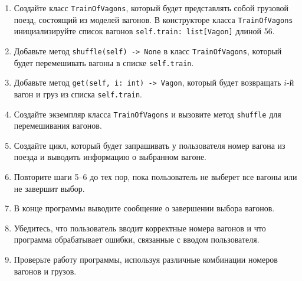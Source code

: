 \begin{enumerate}
\begin{enumerate}
    \item Создайте класс \texttt{TrainOfVagons}, который будет представлять собой грузовой поезд, состоящий из моделей вагонов. В конструкторе класса \texttt{TrainOfVagons} инициализируйте список вагонов \texttt{self.train: list[Vagon]} длиной 56.

    \item Добавьте метод \texttt{shuffle(self) -> None} в класс \texttt{TrainOfVagons}, который будет перемешивать вагоны в списке \texttt{self.train}.

    \item Добавьте метод \texttt{get(self, i: int) -> Vagon}, который будет возвращать $i$-й вагон и груз из списка \texttt{self.train}.

    \item Создайте экземпляр класса \texttt{TrainOfVagons} и вызовите метод \texttt{shuffle} для перемешивания вагонов.

    \item Создайте цикл, который будет запрашивать у пользователя номер вагона из поезда и выводить информацию о выбранном вагоне.

    \item Повторите шаги 5–6 до тех пор, пока пользователь не выберет все вагоны или не завершит выбор.

    \item В конце программы выводите сообщение о завершении выбора вагонов.

    \item Убедитесь, что пользователь вводит корректные номера вагонов и что программа обрабатывает ошибки, связанные с вводом пользователя.

    \item Проверьте работу программы, используя различные комбинации номеров вагонов и грузов.
\end{enumerate}

\end{enumerate}